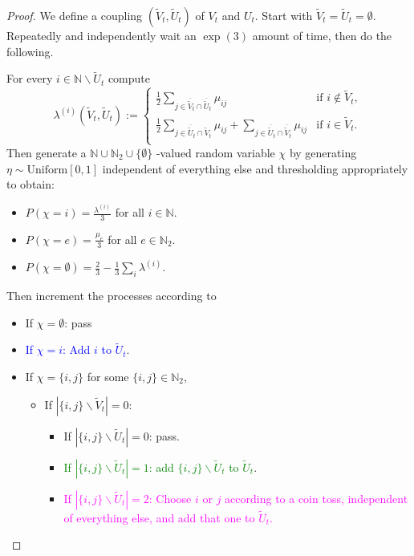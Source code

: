 \documentclass[12pt]{article}
\theoremstyle{definition}
\begin{document}
\begin{proof} We define a coupling $(\tilde{V}_t,\tilde{U}_t)$ of $V_t$ and $U_t$. Start with $\tilde{V}_t=\tilde{U}_t =\emptyset$.
Repeatedly and independently wait an $\exp(3)$ amount of time, then do the following.

For every $i \in \mathbb{N} \backslash \tilde{U}_t$ compute 
\[  \lambda^{(i)}(\tilde{V}_t,\tilde{U}_t) := \left\{
\begin{array}{ll}
      \frac{1}{2}\sum_{j \in \overline{\tilde{V}}_t \cap \overline{\tilde{U}}_t}\mu_{ij} & \text{if } i \notin \tilde{V}_t,\\
      \frac{1}{2}\sum_{j \in \overline{\tilde{U}}_t \cap \tilde{V}_t}\mu_{ij} + \sum_{j \in \overline{\tilde{U}}_t \cap \overline{\tilde{V}}_t}\mu_{ij} & \text{if } i \in \tilde{V}_t. \\
\end{array} 
\right. \]
Then generate a $\mathbb{N} \cup \mathbb{N}_2 \cup \{\emptyset\}$ -valued random variable $\chi$ by generating $\eta \sim \text{Uniform}[0,1]$ independent of everything else and thresholding appropriately to obtain:
\begin{itemize}
    \item $P(\chi = i) = \frac{\lambda^{(i)}}{3}$ for all $ i \in \mathbb{N}$.
    \item $P(\chi = e) = \frac{\mu_{e}}{3}$ for all $e \in \mathbb{N}_2$.
    \item $P(\chi = \emptyset) = \frac{2}{3}-\frac{1}{3}\sum_i \lambda^{(i)}.$ 
\end{itemize}
Then increment the processes according to
\begin{itemize}
    \item If $\chi = \emptyset$: pass 
    \item \textcolor{blue}{If $\chi = i$: Add $i$ to $\tilde{U}_t$}.
    \item If $\chi = \{i,j\}$ for some $\{i,j\} \in \mathbb{N}_2$, 
    \begin{itemize}
        \item If $|\{i,j\}\backslash \tilde{V}_t|=0$:
        \begin{itemize}
            \item If $|\{i,j\}\backslash \tilde{U}_t| = 0$: pass.
            \item \textcolor{green}{If $|\{i,j\} \backslash \tilde{U}_t| =1$: add $\{i,j\} \backslash \tilde{U}_t$ to $\tilde{U}_t$}.
            \item \textcolor{magenta}{If $|\{i,j\} \backslash \tilde{U}_t| = 2$: Choose $i$ or $j$ according to a coin toss, independent of everything else, and add that one to $\tilde{U}_t$.}

\end{itemize}
\end{itemize}
\end{itemize}
\end{proof}
\end{document}
